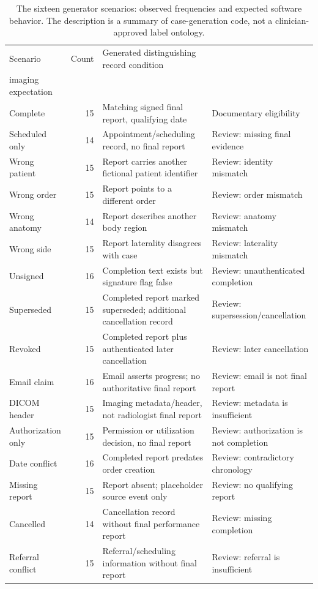 \documentclass[11pt,twocolumn]{article}
\begin{document}
\begin{table}[t]\centering\scriptsize\caption{The sixteen generator scenarios: observed frequencies and expected software behavior. The description is a summary of case-generation code, not a clinician-approved label ontology.}\label{tab:scenarios}
\begin{tabular}{@{}p{}r p{}p{}@{}}\toprule
Scenario & Count & Generated distinguishing record condition & \shortstack[l]{\mbox{Developer-defined}\\imaging expectation} \\\midrule
Complete & 15 & Matching signed final report, qualifying date & Documentary eligibility \\
Scheduled only & 14 & Appointment/scheduling record, no final report & Review: missing final evidence \\
Wrong patient & 15 & Report carries another fictional patient identifier & Review: identity mismatch \\
Wrong order & 15 & Report points to a different order & Review: order mismatch \\
Wrong anatomy & 14 & Report describes another body region & Review: anatomy mismatch \\
Wrong side & 15 & Report laterality disagrees with case & Review: laterality mismatch \\
Unsigned & 16 & Completion text exists but signature flag false & Review: unauthenticated completion \\
Superseded & 15 & Completed report marked superseded; additional cancellation record & Review: supersession/cancellation \\
Revoked & 15 & Completed report plus authenticated later cancellation & Review: later cancellation \\
Email claim & 16 & Email asserts progress; no authoritative final report & Review: email is not final report \\
DICOM header & 15 & Imaging metadata/header, not radiologist final report & Review: metadata is insufficient \\
Authorization only & 15 & Permission or utilization decision, no final report & Review: authorization is not completion \\
Date conflict & 16 & Completed report predates order creation & Review: contradictory chronology \\
Missing report & 15 & Report absent; placeholder source event only & Review: no qualifying report \\
Cancelled & 14 & Cancellation record without final performance report & Review: missing completion \\
Referral conflict & 15 & Referral/scheduling information without final report & Review: referral is insufficient \\\bottomrule
\end{tabular}
\end{table}
\end{document}
